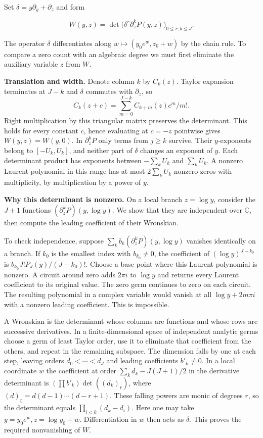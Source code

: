\documentclass[11pt,a4paper]{article}
\begin{document}
Set \(\delta=y\partial_y+\partial_z\) and form

\[
 W(y,z)=\det\big(\delta^r\partial_z^k P(y,z)\big)_{0\le r,k\le J}.
\]

The operator \(\delta\) differentiates along \(w\mapsto (y_0e^w,z_0+w)\) by the chain rule. To compare a zero count with an algebraic degree we must first eliminate the auxiliary variable \(z\) from \(W\).

\textbf{Translation and width.} Denote column \(k\) by \(C_k(z)\). Taylor expansion terminates at \(J-k\) and \(\delta\) commutes with \(\partial_z\), so \[
 C_k(z+c)=\sum_{m=0}^{J-k}C_{k+m}(z)c^m/m!.
\] Right multiplication by this triangular matrix preserves the determinant. This holds for every constant \(c\), hence evaluating at \(c=-z\) pointwise gives \(W(y,z)=W(y,0)\). In \(\partial_z^kP\) only terms from \(j\ge k\) survive. Their \(y\)-exponents belong to \([-U_k,U_k]\), and neither part of \(\delta\) changes an exponent of \(y\). Each determinant product has exponents between \(-\sum_k U_k\) and \(\sum_k U_k\). A nonzero Laurent polynomial in this range has at most \(2\sum_kU_k\) nonzero zeros with multiplicity, by multiplication by a power of \(y\).

\textbf{Why this determinant is nonzero.} On a local branch \(z=\log y\), consider the \(J+1\) functions \((\partial_z^kP)(y,\log y)\). We show that they are independent over \(\mathbb C\), then compute the leading coefficient of their Wronskian.

To check independence, suppose \(\sum_k b_k(\partial_z^kP)(y,\log y)\) vanishes identically on a branch. If \(k_0\) is the smallest index with \(b_{k_0}\ne0\), the coefficient of \((\log y)^{J-k_0}\) is \(b_{k_0}J!P_J(y)/(J-k_0)!\). Choose a base point where this Laurent polynomial is nonzero. A circuit around zero adds \(2\pi i\) to \(\log y\) and returns every Laurent coefficient to its original value. The zero germ continues to zero on each circuit. The resulting polynomial in a complex variable would vanish at all \(\log y+2m\pi i\) with a nonzero leading coefficient. This is impossible.

A Wronskian is the determinant whose columns are functions and whose rows are successive derivatives. In a finite-dimensional space of independent analytic germs choose a germ of least Taylor order, use it to eliminate that coefficient from the others, and repeat in the remaining subspace. The dimension falls by one at each step, leaving orders \(d_0<\cdots<d_J\) and leading coefficients \(b'_k\ne0\). In a local coordinate \(w\) the coefficient at order \(\sum_k d_k-J(J+1)/2\) in the derivative determinant is \((\prod b'_k)\det((d_k)_{\underline r})\), where \((d)_{\underline r}=d(d-1)\cdots(d-r+1)\). These falling powers are monic of degrees \(r\), so the determinant equals \(\prod_{i<k}(d_k-d_i)\). Here one may take \(y=y_0 e^w,z=\log y_0+w\). Differentiation in \(w\) then acts as \(\delta\). This proves the required nonvanishing of \(W\).
\end{document}
